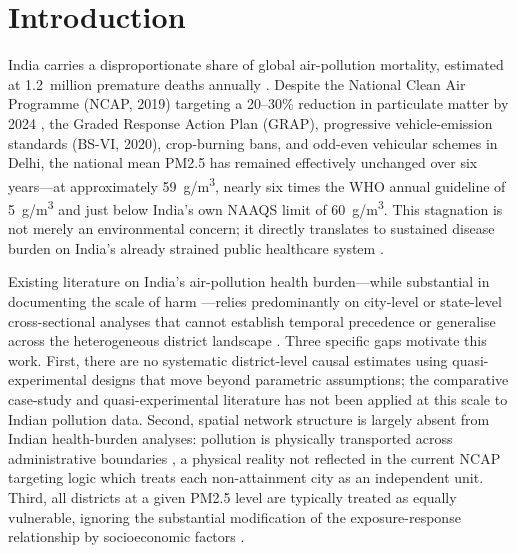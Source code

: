 \documentclass{article}
\begin{document}
\begin{abstract}
districts in Uttar Pradesh and Bihar sustain respiratory case rates 2.7$\times$ higher than
Delhi (mean PM2.5 $= 110$~\textmu{}g/m\textsuperscript{3}) despite only moderate pollution
($70.4$~\textmu{}g/m\textsuperscript{3}), driven by socioeconomic vulnerability. National
PM2.5 remained stationary ($58.9 \to 59.0$~\textmu{}g/m\textsuperscript{3}, 2018--2023),
with CUSUM analysis detecting only seasonal transitions and no structural trend break.
A 20\% coordinated PM2.5 reduction is estimated to avert $951{,}100$ respiratory
cases across the panel. Our results argue for airshed-based governance, vulnerability-indexed
intervention targeting, and tighter integration of pollution monitoring with healthcare
planning.
\end{abstract}

\section{Introduction}
\label{sec:intro}

India carries a disproportionate share of global air-pollution mortality, estimated at
1.2~million premature deaths annually \cite{landrigan2018}. Despite the National Clean Air
Programme (NCAP, 2019) targeting a 20--30\% reduction in particulate matter by 2024
\cite{moefcc2019}, the Graded Response Action Plan (GRAP), progressive vehicle-emission
standards (BS-VI, 2020), crop-burning bans, and odd-even vehicular schemes in Delhi, the
national mean PM2.5 has remained effectively unchanged over six years---at approximately
59~\textmu{}g/m\textsuperscript{3}, nearly six times the WHO annual guideline of
5~\textmu{}g/m\textsuperscript{3} and just below India's own NAAQS limit of
60~\textmu{}g/m\textsuperscript{3}. This stagnation is not merely an environmental concern;
it directly translates to sustained disease burden on India's already strained public
healthcare system \cite{balakrishnan2019}.

Existing literature on India's air-pollution health burden---while substantial in documenting
the scale of harm \cite{landrigan2018,gbd2019}---relies predominantly on city-level or
state-level cross-sectional analyses that cannot establish temporal precedence or generalise
across the heterogeneous district landscape \cite{balakrishnan2019}. Three specific gaps
motivate this work. First, there are no systematic district-level causal estimates using
quasi-experimental designs that move beyond parametric assumptions; the comparative
case-study and quasi-experimental literature \cite{abadie2010,blundell2009} has not been
applied at this scale to Indian pollution data. Second, spatial network structure is largely
absent from Indian health-burden analyses: pollution is physically transported across
administrative boundaries \cite{anselin1995}, a physical reality not reflected in the
current NCAP targeting logic which treats each non-attainment city as an independent unit.
Third, all districts at a given PM2.5 level are typically treated as equally vulnerable,
ignoring the substantial modification of the exposure-response relationship by socioeconomic
factors \cite{dominici2006}.
\end{document}
